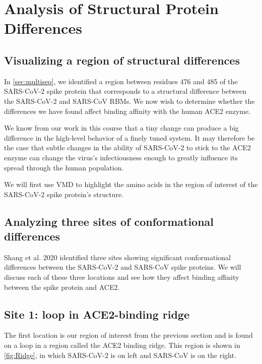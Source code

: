 \FloatBarrier
{}

\section{Analysis of Structural Protein Differences}
\label{sec:structural_differences}
\subsection{Visualizing a region of structural differences}

In \autoref{sec:multiseq}, we identified a region between residues 476 and 485 of the SARS-CoV-2 spike protein that corresponds to a structural difference between the SARS-CoV-2 and SARS-CoV RBMs. We now wish to determine whether the differences we have found affect binding affinity with the human ACE2 enzyme.

We know from our work in this course that a tiny change can produce a big difference in the high-level behavior of a finely tuned system. It may therefore be the case that subtle changes in the ability of SARS-CoV-2 to stick to the ACE2 enzyme can change the virus's infectiousness enough to greatly influence its spread through the human population.

We will first use VMD to highlight the amino acids in the region of interest of the SARS-CoV-2 spike protein's structure. 

\FloatBarrier
{}
\subsection{Analyzing three sites of conformational differences}

Shang et al. 2020 identified three sites showing significant conformational differences between the SARS-CoV-2 and SARS-CoV spike proteins. We will discuss each of these three locations and see how they affect binding affinity between the spike protein and ACE2.

\FloatBarrier
{}
\subsection{Site 1: loop in ACE2-binding ridge}

The first location is our region of interest from the previous section and is found on a loop in a region called the ACE2 binding ridge. This region is shown in \autoref{fig:Ridge}, in which SARS-CoV-2 is on left and SARS-CoV is on the right.

